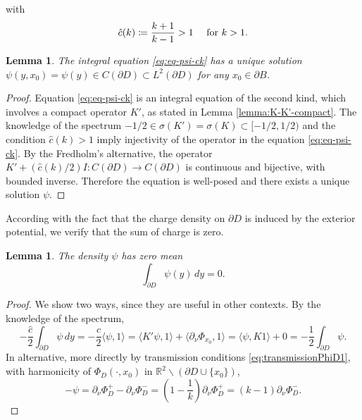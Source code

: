 \documentclass[10pt, a4paper, twoside, openright]{book}
\theoremstyle{definition}
\theoremstyle{plain}
\theoremstyle{plain}
\theoremstyle{plain}
\theoremstyle{plain}
\theoremstyle{plain}
\newtheorem{lemma}[subsection]{Lemma}
\theoremstyle{plain}
\theoremstyle{plain}
\theoremstyle{plain}
\begin{document}
with 
\begin{equation}
 \hat{c}(k)\coloneqq\dfrac{k+1}{k-1} > 1 \quad \textup{ for } k>1.
\end{equation}
\begin{lemma}
 The integral equation \eqref{eq:eq-psi-ck} has a unique solution $\psi(y,x_0)=\psi(y) \in C(\partial D) \subset L^2(\partial D)$ for any $x_0 \in \partial B$.
\end{lemma}
\begin{proof}
 Equation \eqref{eq:eq-psi-ck} is an integral equation of the second kind, which involves a compact operator $K'$, 
 as stated in Lemma \ref{lemma:K-K'-compact}. The knowledge of the spectrum $-1/2 \in \sigma(K')=\sigma(K) \subset [-1/2,1/2)$ and the condition $\hat{c}(k)>1$ imply injectivity of the operator in the equation \eqref{eq:eq-psi-ck}. 
 By the Fredholm's alternative, the operator $K'+(\hat{c}(k)/2)I:C(\partial D)\to C(\partial D)$ is continuous and bijective, with bounded inverse.
 Therefore the equation is well-posed and there exists a unique solution $\psi$.
\end{proof}
According with the fact that the charge density on $\partial D$ is induced by the exterior 
potential, we verify that the sum of charge is zero.
\begin{lemma}
 The density $\psi$ has zero mean
 \begin{equation}
  \int_{\partial D} \psi(y)\, dy = 0.
 \end{equation}
\end{lemma}
\begin{proof}
We show two ways, since they are useful in other contexts. By the knowledge of the spectrum,
 \begin{equation*}
  -\frac{\hat{c}}{2} \int_{\partial D} \psi\,dy = -\frac{\hat{c}}{2} \langle \psi,1\rangle = \langle K'\psi,1\rangle + \langle \partial_\nu\Phi_{x_0},1\rangle = \langle \psi,K 1\rangle + 0 = -\frac{1}{2}\int_{\partial D} \psi.
 \end{equation*}
 In alternative, more directly by transmission conditions \eqref{eq:transmissionPhiD1}, with harmonicity of $\Phi_D(\cdot,x_0)$ in $\mathbb{R}^2\backslash(\partial D\cup\{x_0\})$,
 \begin{equation*}
  -\psi=\partial_\nu \Phi_D^+-\partial_\nu \Phi_D^-=(1-\frac{1}{k})\partial_\nu \Phi_D^+ = (k-1)\partial_\nu \Phi_D^-.
 \end{equation*} 
\end{proof}
\end{document}

